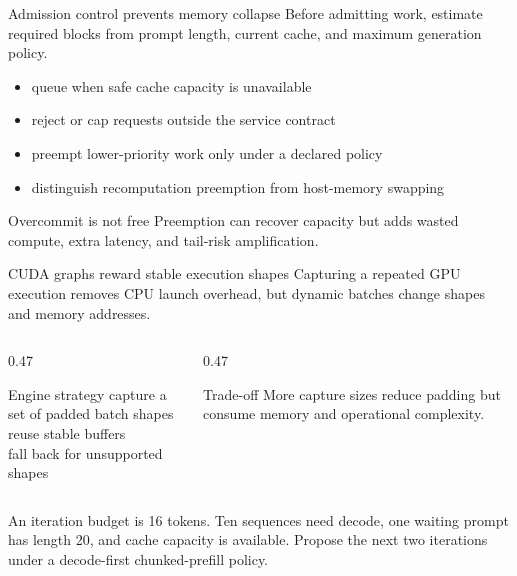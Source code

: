 \documentclass[handout]{beamer}
\begin{document}
\begin{frame}{Admission control prevents memory collapse}
  Before admitting work, estimate required blocks from prompt length, current cache, and maximum generation policy.
  \begin{itemize}
    \setlength{\itemsep}{7pt}
    \item queue when safe cache capacity is unavailable
    \item reject or cap requests outside the service contract
    \item preempt lower-priority work only under a declared policy
    \item distinguish recomputation preemption from host-memory swapping
  \end{itemize}
  \begin{alertblock}{Overcommit is not free}
    Preemption can recover capacity but adds wasted compute, extra latency, and tail-risk amplification.
  \end{alertblock}
\end{frame}

\begin{frame}{CUDA graphs reward stable execution shapes}
  Capturing a repeated GPU execution removes CPU launch overhead, but dynamic batches change shapes and memory addresses.
  \begin{columns}[t]
    \begin{column}{0.47\linewidth}
      \begin{block}{Engine strategy}
        capture a set of padded batch shapes\\reuse stable buffers\\fall back for unsupported shapes
      \end{block}
    \end{column}
    \begin{column}{0.47\linewidth}
      \begin{alertblock}{Trade-off}
        More capture sizes reduce padding but consume memory and operational complexity.
      \end{alertblock}
    \end{column}
  \end{columns}
\end{frame}

  {An iteration budget is 16 tokens. Ten sequences need decode, one waiting prompt has length 20, and cache capacity is available. Propose the next two iterations under a decode-first chunked-prefill policy.}
\end{document}
